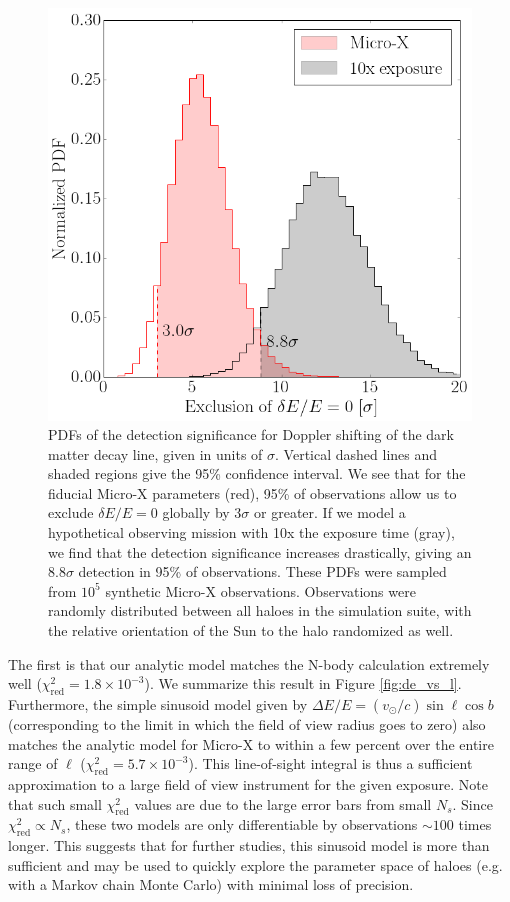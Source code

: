\documentclass[aps,prd,10pt,twocolumn,superscriptaddress,showpacs]{revtex4-1}
\begin{document}
\begin{figure}[h!]
\centering
\includegraphics[width=1.0\columnwidth]{sig_pdf.png}
\caption{ 
	PDFs of the detection significance for Doppler shifting of the dark matter decay line, given in
	units of $\sigma$. Vertical dashed lines and shaded regions give the 95\% confidence interval.
	We see that for the fiducial Micro-X parameters (red), 95\% of observations allow us to exclude
	$\delta E/E=0$ globally by $3\sigma$ or greater. If we model a hypothetical observing mission with
	10x the exposure time (gray), we find that the detection significance increases drastically, giving an
	$8.8\sigma$ detection in 95\% of observations. 
	These PDFs were sampled from $10^5$ synthetic Micro-X observations. Observations were randomly distributed
	between all haloes in the simulation suite, with the relative orientation of the Sun to the halo
	randomized as well. 
}
\label{fig:sigma_pdf}
\end{figure}



The first is that our analytic model matches the N-body calculation
extremely well ($\chi^2_\mathrm{red}=1.8\times 10^{-3}$).  We summarize this result in Figure
\ref{fig:de_vs_l}. Furthermore, the simple sinusoid model given by $\Delta E/E
= (v_\odot/c) \sin \ell \cos b$ (corresponding to the limit in which the field of view radius goes to
zero) also matches the analytic model for Micro-X to within a few percent over the entire range of
$\ell$ ($\chi^2_\mathrm{red}=5.7\times 10^{-3}$). This line-of-sight integral is thus
a sufficient approximation to a large field of view instrument for the given exposure. 
Note that such small $\chi^2_\mathrm{red}$ values are due to the large error bars from small $N_s$.
Since $\chi^2_\mathrm{red} \propto N_s$, these two models are 
only differentiable by observations $\sim 100$ times longer.  
This suggests that for further studies, this sinusoid model is more than sufficient and may be
used to quickly explore the parameter space of haloes (e.g. with a Markov chain Monte Carlo) with minimal loss of precision.
\end{document}
